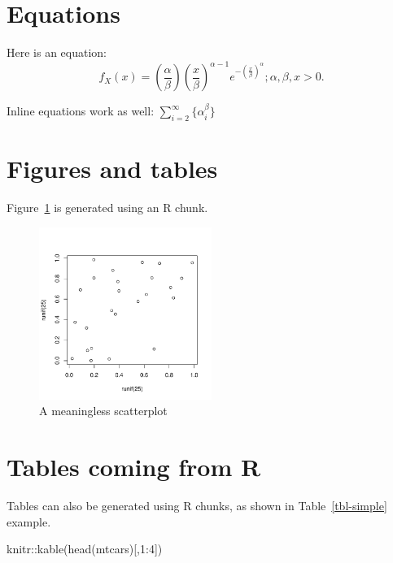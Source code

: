\documentclass[
  authoryear,
  preprint,
  3p]{elsarticle}
\newenvironment{Shaded}{\begin{snugshade}}{\end{snugshade}}
\newcommand{\DecValTok}[1]{\textcolor[rgb]{0.68,0.00,0.00}{#1}}
\newcommand{\FunctionTok}[1]{\textcolor[rgb]{0.28,0.35,0.67}{#1}}
\newcommand{\NormalTok}[1]{\textcolor[rgb]{0.00,0.23,0.31}{#1}}
\newcommand{\SpecialCharTok}[1]{\textcolor[rgb]{0.37,0.37,0.37}{#1}}
\begin{document}
\hypertarget{equations}{%
\section{Equations}\label{equations}}

Here is an equation: \[ 
  f_{X}(x) = \left(\frac{\alpha}{\beta}\right)
  \left(\frac{x}{\beta}\right)^{\alpha-1}
  e^{-\left(\frac{x}{\beta}\right)^{\alpha}}; 
  \alpha,\beta,x > 0 .
\]

Inline equations work as well: \(\sum_{i = 2}^\infty\{\alpha_i^\beta\}\)

\hypertarget{figures-and-tables}{%
\section{Figures and tables}\label{figures-and-tables}}

Figure~\ref{fig-meaningless} is generated using an R chunk.

\begin{figure}

{\centering \includegraphics[width=0.5\textwidth,height=\textheight]{manuscript_files/figure-pdf/fig-meaningless-1.pdf}

}

\caption{\label{fig-meaningless}A meaningless scatterplot}

\end{figure}

\hypertarget{tables-coming-from-r}{%
\section{Tables coming from R}\label{tables-coming-from-r}}

Tables can also be generated using R chunks, as shown in
Table~\ref{tbl-simple} example.

\begin{Shaded}
\begin{Highlighting}[]
\NormalTok{knitr}\SpecialCharTok{::}\FunctionTok{kable}\NormalTok{(}\FunctionTok{head}\NormalTok{(mtcars)[,}\DecValTok{1}\SpecialCharTok{:}\DecValTok{4}\NormalTok{])}
\end{Highlighting}
\end{Shaded}
\end{document}
